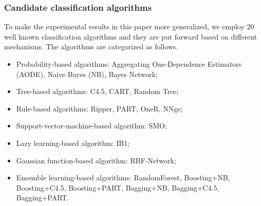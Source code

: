 \documentclass[review,3p,twocolumn,times]{elsarticle}
\begin{document}
%					


\subsubsection{Candidate classification algorithms}

To make the experimental results in this paper more generalized, we employ 20 well known classification algorithms and they are put forward based on different mechanisms. The algorithms are categorized as follows.

\begin{itemize}
	\item Probability-based algorithms: Aggregating One-Dependence Estimators (AODE), Naive Bayes (NB), Bayes Network;
	\item Tree-based algorithms: C4.5, CART, Random Tree;
	\item Rule-based algorithms: Ripper, PART, OneR, NNge;
	\item Support-vector-machine-based algorithm: SMO;
	\item Lazy learning-based algorithm: IB1;
	\item Gaussian function-based algorithm: RBF-Network;
	\item Ensemble learning-based algorithms: RandomForest, Boosting+NB, Boosting+C4.5, Boosting+PART, Bagging+NB, Bagging+C4.5, Bagging+PART.
\end{itemize}
\end{document}
